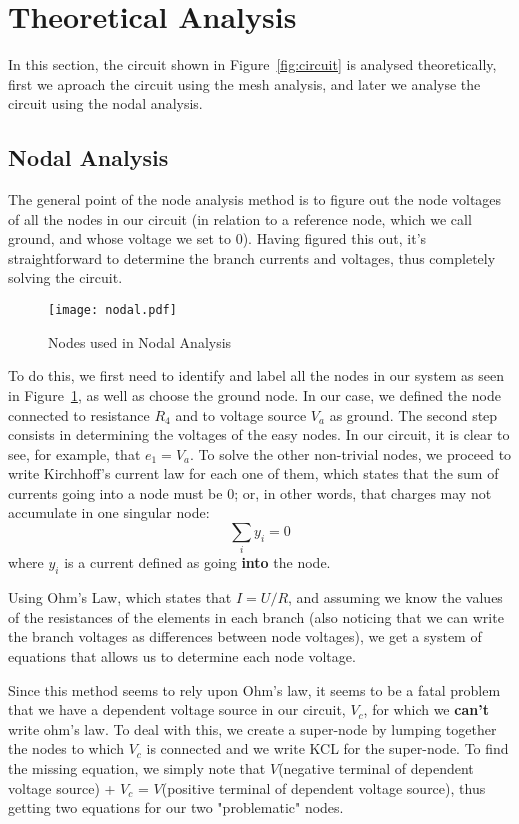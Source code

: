 \section{Theoretical Analysis}
\label{sec:analysis}

In this section, the circuit shown in Figure~\ref{fig:circuit} is analysed
theoretically, first we aproach the circuit using the mesh analysis, and later we analyse the circuit using the nodal analysis.


\subsection{Nodal Analysis}

The general point of the node analysis method is to figure out the node voltages of all the nodes in our circuit (in relation to a reference node,
which we call ground, and whose voltage we set to 0). Having figured this out,
it's straightforward to determine the branch currents and voltages, thus completely solving the circuit. 
\par

\begin{figure}[H] \centering
  \texttt{[image: nodal.pdf]}
  \caption{Nodes used in Nodal Analysis}
  \label{fig:nodal}
\end{figure}

To do this, we first need to identify and label all the nodes in our system as seen in Figure~\ref{fig:nodal},
 as well as choose the ground node. In our case, we defined the node connected to 
 resistance $R_4$ and to voltage source $V_a$ as ground. The second step consists in determining
  the voltages of the easy nodes. In our circuit, it is clear to see, for example, that $e_1 = V_a$.
   To solve the other non-trivial nodes, we proceed to write Kirchhoff's current law for each one of them,
    which states that the sum of currents going into a node must be 0;
     or, in other words, that charges may not accumulate in one singular node:
\begin{equation*}
    \sum_{i} y_i = 0
\end{equation*}
where $y_i$ is a current defined as going \textbf{into} the node.\par
Using Ohm's Law, which states that $I = U/R$, and assuming we know the values of the resistances
 of the elements in each branch (also noticing that we can write the branch
  voltages as differences between node voltages), we get a system of equations that
   allows us to determine each node voltage.
\par
Since this method seems to rely upon Ohm's law, it seems to be a fatal problem that we have a dependent voltage source in our circuit,
$V_c$, for which we \textbf{can't} write ohm's law. To deal with this,
we create a super-node by lumping together the nodes to which $V_c$ is connected and we write KCL
for the super-node. To find the missing equation, we simply note that
$V$(negative terminal of dependent voltage source) + $V_c$ = $V$(positive terminal of dependent voltage source),
thus getting two equations for our two "problematic" nodes.

